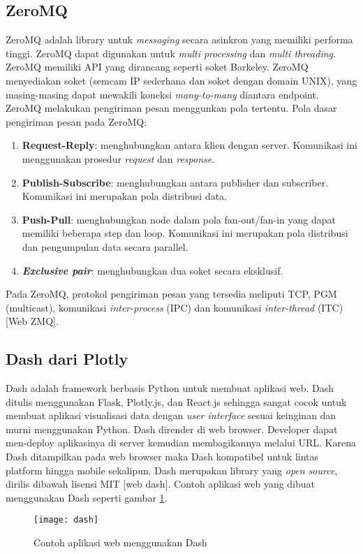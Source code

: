 \documentclass[../thesis.tex]{subfiles}
\begin{document}
\subsection{ZeroMQ}
ZeroMQ adalah library untuk \textit{messaging} secara asinkron yang memiliki performa tinggi. ZeroMQ dapat digunakan untuk \textit{multi processing} dan \textit{multi threading}.
ZeroMQ memiliki API yang dirancang seperti soket Barkeley.
ZeroMQ menyediakan soket (semcam IP sederhana dan soket dengan domain UNIX), yang masing-masing dapat mewakili koneksi \textit{many-to-many} diantara endpoint. ZeroMQ melakukan pengiriman pesan menggunkan pola tertentu.
Pola dasar pengiriman pesan pada ZeroMQ:
\begin{enumerate}
	\item \textbf{Request-Reply}: menghubungkan antara klien dengan server. Komunikasi ini menggunakan prosedur \textit{request} dan \textit{response}.
	\item \textbf{Publish-Subscribe}: menghubungkan antara publisher dan subscriber. Komunikasi ini merupakan pola distribusi data.
	\item \textbf{Push-Pull}: menghubungkan node dalam pola fan-out/fan-in yang dapat memiliki beberapa step dan loop. Komunikasi ini merupakan pola distribusi dan pengumpulan data secara parallel. 
	\item \textbf{\textit{Exclusive pair}}: menghubungkan dua soket secara eksklusif.
\end{enumerate}
Pada ZeroMQ, protokol pengiriman pesan yang tersedia meliputi TCP, PGM (multicast), komunikasi \textit{inter-process} (IPC) dan komunikasi \textit{inter-thread} (ITC) [Web ZMQ].

\subsection{Dash dari Plotly}
Dash adalah framework berbasis Python untuk membuat aplikasi web. Dash ditulis menggunakan Flask, Plotly.js, dan React.js sehingga sangat cocok untuk membuat aplikasi visualisasi data dengan \textit{user interface} sesuai keinginan dan murni menggunakan Python. 
Dash dirender di web browser. Developer dapat men-deploy aplikasinya di server kemudian membagikannya melalui URL. Karena Dash ditampilkan pada web browser maka Dash kompatibel untuk lintas platform hingga mobile sekalipun. 
Dash merupakan library yang \textit{open source}, dirilis dibawah lisensi MIT [web dash]. Contoh aplikasi web yang dibuat menggunakan Dash seperti gambar \ref{Dash}.
\begin{figure}[htp]
	\centering
	\texttt{[image: dash]}
	\caption{Contoh aplikasi web menggunakan Dash}
	\label{Dash}
\end{figure}
\end{document}

